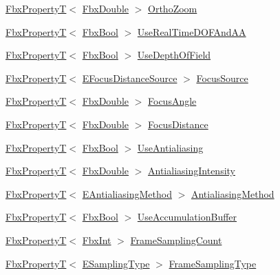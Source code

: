 \begin{DoxyCompactItemize}
\item 
\hyperlink{class_fbx_property_t}{Fbx\+PropertyT}$<$ \hyperlink{fbxtypes_8h_a171e72a1c46fc15c1a6c9c31948c1c5b}{Fbx\+Double} $>$ \hyperlink{class_fbx_camera_a038fab99051fa0171f60f40469eff7cc}{Ortho\+Zoom}
\item 
\hyperlink{class_fbx_property_t}{Fbx\+PropertyT}$<$ \hyperlink{fbxtypes_8h_a92e0562b2fe33e76a242f498b362262e}{Fbx\+Bool} $>$ \hyperlink{class_fbx_camera_a57b4706a5d4d2678c5e31430b9a4ba61}{Use\+Real\+Time\+D\+O\+F\+And\+AA}
\item 
\hyperlink{class_fbx_property_t}{Fbx\+PropertyT}$<$ \hyperlink{fbxtypes_8h_a92e0562b2fe33e76a242f498b362262e}{Fbx\+Bool} $>$ \hyperlink{class_fbx_camera_a5b101aeb02696ef3e140505f01e6f797}{Use\+Depth\+Of\+Field}
\item 
\hyperlink{class_fbx_property_t}{Fbx\+PropertyT}$<$ \hyperlink{class_fbx_camera_a1b50e7b2953019a40328599679071ad4}{E\+Focus\+Distance\+Source} $>$ \hyperlink{class_fbx_camera_a17f0c0c82ed8df4540d918567edcbd4a}{Focus\+Source}
\item 
\hyperlink{class_fbx_property_t}{Fbx\+PropertyT}$<$ \hyperlink{fbxtypes_8h_a171e72a1c46fc15c1a6c9c31948c1c5b}{Fbx\+Double} $>$ \hyperlink{class_fbx_camera_af6d282d878bc8ad143c8095e29a4e94a}{Focus\+Angle}
\item 
\hyperlink{class_fbx_property_t}{Fbx\+PropertyT}$<$ \hyperlink{fbxtypes_8h_a171e72a1c46fc15c1a6c9c31948c1c5b}{Fbx\+Double} $>$ \hyperlink{class_fbx_camera_af6165df26c7d25156163a3ed2a2f99c2}{Focus\+Distance}
\item 
\hyperlink{class_fbx_property_t}{Fbx\+PropertyT}$<$ \hyperlink{fbxtypes_8h_a92e0562b2fe33e76a242f498b362262e}{Fbx\+Bool} $>$ \hyperlink{class_fbx_camera_a2d23acad0d49eadb63be01b826404d34}{Use\+Antialiasing}
\item 
\hyperlink{class_fbx_property_t}{Fbx\+PropertyT}$<$ \hyperlink{fbxtypes_8h_a171e72a1c46fc15c1a6c9c31948c1c5b}{Fbx\+Double} $>$ \hyperlink{class_fbx_camera_a3e7ddc27aff98a3850f58d8b800b6613}{Antialiasing\+Intensity}
\item 
\hyperlink{class_fbx_property_t}{Fbx\+PropertyT}$<$ \hyperlink{class_fbx_camera_a44949ea304940f214a2f23a66dcbf45f}{E\+Antialiasing\+Method} $>$ \hyperlink{class_fbx_camera_a1ad348a909fc9cd51173f5a424660ac1}{Antialiasing\+Method}
\item 
\hyperlink{class_fbx_property_t}{Fbx\+PropertyT}$<$ \hyperlink{fbxtypes_8h_a92e0562b2fe33e76a242f498b362262e}{Fbx\+Bool} $>$ \hyperlink{class_fbx_camera_ae858c35fdbb3ec3bb853bfa739dd2fad}{Use\+Accumulation\+Buffer}
\item 
\hyperlink{class_fbx_property_t}{Fbx\+PropertyT}$<$ \hyperlink{fbxtypes_8h_a088fa96de3b0b3ea69f0f6afef525dfb}{Fbx\+Int} $>$ \hyperlink{class_fbx_camera_a71ee6802b2a63149cfa33f11548893ea}{Frame\+Sampling\+Count}
\item 
\hyperlink{class_fbx_property_t}{Fbx\+PropertyT}$<$ \hyperlink{class_fbx_camera_aed549486ed0985230efca6fae0d731ae}{E\+Sampling\+Type} $>$ \hyperlink{class_fbx_camera_ab2048abc7b353f908a7c3caba7d0acf2}{Frame\+Sampling\+Type}
\end{DoxyCompactItemize}
